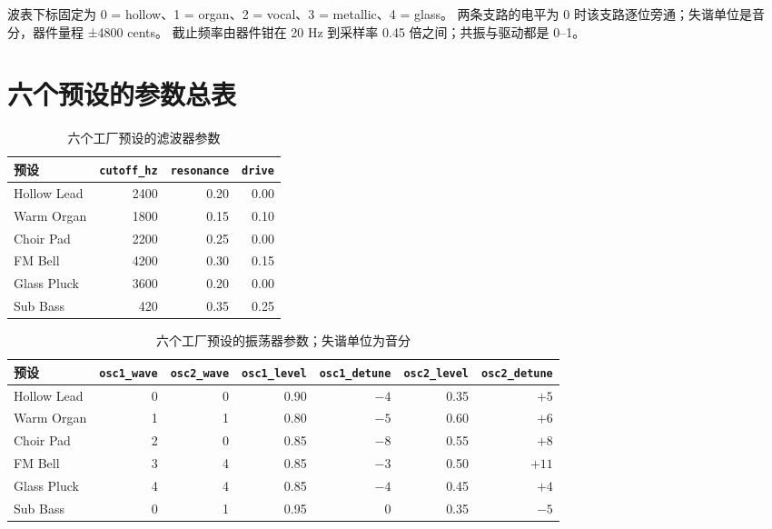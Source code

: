 波表下标固定为 0 = hollow、1 = organ、2 = vocal、3 = metallic、4 = glass。
两条支路的电平为 0 时该支路逐位旁通；失谐单位是音分，器件量程 ±4800 cents。
截止频率由器件钳在 20 Hz 到采样率 0.45 倍之间；共振与驱动都是 0–1。

\section{六个预设的参数总表}

\begin{table}[htbp]
\centering
\small
\begin{tabular}{@{}lrrr@{}}
\hline
预设 & \texttt{cutoff\_hz} & \texttt{resonance} & \texttt{drive} \\
\hline
Hollow Lead & 2400 & 0.20 & 0.00 \\
Warm Organ & 1800 & 0.15 & 0.10 \\
Choir Pad & 2200 & 0.25 & 0.00 \\
FM Bell & 4200 & 0.30 & 0.15 \\
Glass Pluck & 3600 & 0.20 & 0.00 \\
Sub Bass & 420 & 0.35 & 0.25 \\
\hline
\end{tabular}
\caption{六个工厂预设的滤波器参数}
\label{tab:voice-filter}
\end{table}

\begin{table}[htbp]
\centering
\small
\begin{tabular}{@{}lrrrrrr@{}}
\hline
预设 & \texttt{osc1\_wave} & \texttt{osc2\_wave} & \texttt{osc1\_level} & \texttt{osc1\_detune} & \texttt{osc2\_level} & \texttt{osc2\_detune} \\
\hline
Hollow Lead & 0 & 0 & 0.90 & $-4$ & 0.35 & $+5$ \\
Warm Organ & 1 & 1 & 0.80 & $-5$ & 0.60 & $+6$ \\
Choir Pad & 2 & 0 & 0.85 & $-8$ & 0.55 & $+8$ \\
FM Bell & 3 & 4 & 0.85 & $-3$ & 0.50 & $+11$ \\
Glass Pluck & 4 & 4 & 0.85 & $-4$ & 0.45 & $+4$ \\
Sub Bass & 0 & 1 & 0.95 & $0$ & 0.35 & $-5$ \\
\hline
\end{tabular}
\caption{六个工厂预设的振荡器参数；失谐单位为音分}
\label{tab:voice-osc}
\end{table}



